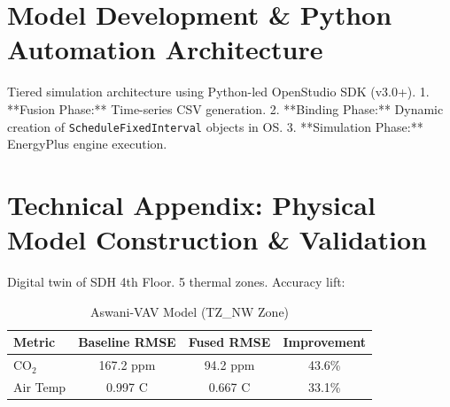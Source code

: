 \documentclass[11pt,a4paper]{article}
\begin{document}
\section{Model Development \& Python Automation Architecture}
Tiered simulation architecture using Python-led OpenStudio SDK (v3.0+). 
1. **Fusion Phase:** Time-series CSV generation. 2. **Binding Phase:** Dynamic creation of \texttt{ScheduleFixedInterval} objects in OS. 3. **Simulation Phase:** EnergyPlus engine execution.

\section{Technical Appendix: Physical Model Construction \& Validation}
Digital twin of SDH 4th Floor. 5 thermal zones. Accuracy lift:
\begin{table}[h]
\centering
\caption{Aswani-VAV Model (TZ\_NW Zone)}
\begin{tabular}{@{}lccc@{}}
\toprule
\textbf{Metric} & \textbf{Baseline RMSE} & \textbf{Fused RMSE} & \textbf{Improvement} \\ \midrule
CO$_2$          & 167.2 ppm              & 94.2 ppm            & 43.6\%               \\
Air Temp        & 0.997 C                & 0.667 C             & 33.1\%               \\ \bottomrule
\end{tabular}
\end{table}



\end{document}
